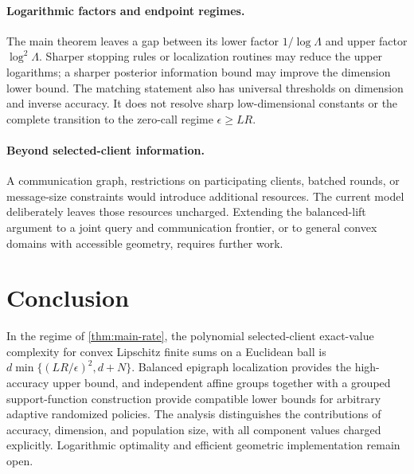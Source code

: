 \documentclass[11pt]{article}
\numberwithin{equation}{section}
\theoremstyle{remark}
\theoremstyle{definition}
\newcommand{\eps}{\epsilon}
\begin{document}
\paragraph{Logarithmic factors and endpoint regimes.}
The main theorem leaves a gap between its lower factor
$1/\log\Lambda$ and upper factor $\log^2\Lambda$.
Sharper stopping rules or localization routines may reduce the upper
logarithms; a sharper posterior information bound may improve the
dimension lower bound. The matching statement also has universal
thresholds on dimension and inverse accuracy. It does not resolve
sharp low-dimensional constants or the complete transition to the
zero-call regime $\eps\ge LR$.

\paragraph{Beyond selected-client information.}
A communication graph, restrictions on participating clients, batched
rounds, or message-size constraints would introduce additional
resources. The current model deliberately leaves those resources
uncharged. Extending the balanced-lift argument to a joint query and
communication frontier, or to general convex domains with accessible
geometry, requires further work.

\section{Conclusion}

In the regime of \cref{thm:main-rate}, the polynomial selected-client
exact-value complexity for convex Lipschitz finite sums on a Euclidean ball is
$d\min\{(LR/\eps)^2,d+N\}$.
Balanced epigraph localization provides the high-accuracy upper bound,
and independent affine groups together with a grouped support-function
construction provide compatible lower bounds for arbitrary adaptive
randomized policies. The analysis distinguishes the contributions of
accuracy, dimension, and population size, with all component values
charged explicitly. Logarithmic optimality and efficient geometric
implementation remain open.
\end{document}
